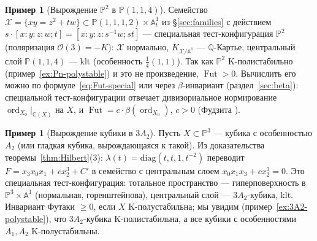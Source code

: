 \documentclass[11pt,a4paper]{article}
\theoremstyle{plain}
\theoremstyle{definition}
\newtheorem{example}[theorem]{Пример}
\theoremstyle{remark}
\renewcommand{\C}{\mathbb{C}}
\newcommand{\Q}{\mathbb{Q}}
\newcommand{\PP}{\mathbb{P}}
\newcommand{\A}{\mathbb{A}}
\newcommand{\cO}{\mathcal{O}}
\newcommand{\cX}{\mathcal{X}}
\DeclareMathOperator{\ord}{ord}
\DeclareMathOperator{\Fut}{Fut}
\begin{document}
\begin{example}[Вырождение $\PP^2$ в $\PP(1,1,4)$]\label{ex:P2-to-P114}
Семейство $\cX=\{xy=z^2+tw\}\subset\PP(1,1,1,2)\times\A^1_t$ из \S\ref{sec:families} с действием
$s\cdot[x:y:z:w;t]=[x:y:z:s^{-1}w;st]$ --- специальная тест-конфигурация $\PP^2$ (поляризация
$\cO(3)=-K$): $\cX$ нормально, $K_{\cX/\A^1}$ --- $\Q$-Картье, центральный слой
$\PP(1,1,4)$ --- klt (особенность $\frac14(1,1)$). Так как $\PP^2$ K-полистабильно
(пример~\ref{ex:Pn-polystable}) и это не произведение, $\Fut>0$. Вычислить его можно по
формуле~\eqref{eq:Fut-special} или через $\beta$-инвариант (раздел~\ref{sec:beta}): специальной
тест-конфигурации отвечает дивизориальное нормирование $\ord_{X_0}|_{\C(X)}$ на $X$, и
$\Fut=c\cdot\beta(\ord_{X_0})$, $c>0$ (Фудзита \cite{Fuj19b}).
\end{example}

\begin{example}[Вырождение кубики в $3A_2$]\label{ex:cubic-to-3A2}
Пусть $X\subset\PP^3$ --- кубика с особенностью $A_2$ (или гладкая кубика, вырождающаяся к такой).
Из доказательства теоремы~\ref{thm:Hilbert}(3): $\lambda(t)=\mathrm{diag}(t,t,1,t^{-2})$ переводит
$F=x_3x_0x_1+cx_2^3+C'$ в семейство с центральным слоем $x_0x_1x_3+cx_2^3=0$. Это специальная
тест-конфигурация: тотальное пространство --- гиперповерхность в $\PP^3\times\A^1$ (нормальная,
горенштейнова), центральный слой --- $3A_2$-кубика, klt. Инвариант Футаки $\ge0$, если $X$
K-полустабильна; мы увидим (пример~\ref{ex:3A2-polystable}), что $3A_2$-кубика K-полистабильна, а
все кубики с особенностями $A_1,A_2$ K-полустабильны.
\end{example}
\end{document}
